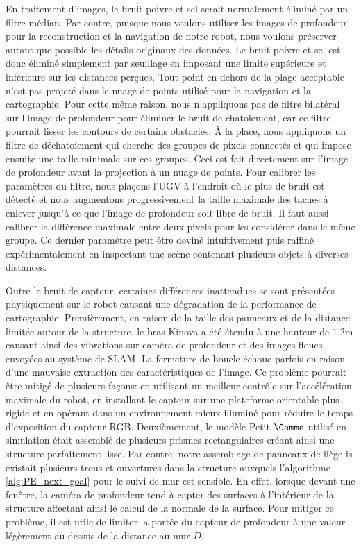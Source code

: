 En traitement d'images, le bruit poivre et sel serait normalement éliminé par un filtre médian. Par contre, puisque nous voulons utiliser les images de profondeur pour la reconstruction et la navigation de notre robot, nous voulons préserver autant que possible les détails originaux des données. Le bruit poivre et sel est donc éliminé simplement par seuillage en imposant une limite supérieure et inférieure sur les distances perçues. Tout point en dehors de la plage acceptable n'est pas projeté dans le nuage de points utilisé pour la navigation et la cartographie. Pour cette même raison, nous n'appliquons pas de filtre bilatéral sur l'image de profondeur pour éliminer le bruit de chatoiement, car ce filtre pourrait lisser les contours de certains obstacles. À la place, nous appliquons un filtre de déchatoiement qui cherche des groupes de pixels connectés et qui impose ensuite une taille minimale sur ces groupes. Ceci est fait directement sur l'image de profondeur avant la projection à un nuage de points. Pour calibrer les paramètres du filtre, nous plaçons l'UGV à l'endroit où le plus de bruit est détecté et nous augmentons progressivement la taille maximale des taches à enlever jusqu'à ce que l'image de profondeur soit libre de bruit. Il faut aussi calibrer la différence maximale entre deux pixels pour les considérer dans le même groupe. Ce dernier paramètre peut être deviné intuitivement puis raffiné expérimentalement en inspectant une scène contenant plusieurs objets à diverses distances.

Outre le bruit de capteur, certaines différences inattendues se sont présentées physiquement sur le robot causant une dégradation de la performance de cartographie. Premièrement, en raison de la taille des panneaux et de la distance limitée autour de la structure, le bras Kinova a été étendu à une hauteur de $1.2$m causant ainsi des vibrations sur caméra de profondeur et des images floues envoyées au système de SLAM. La fermeture de boucle échoue parfois en raison d'une mauvaise extraction des caractéristiques de l'image. Ce problème pourrait être mitigé de plusieurs façons: en utilisant un meilleur contrôle sur l'accélération maximale du robot, en installant le capteur sur une plateforme orientable plus rigide et en opérant dans un environnement mieux illuminé pour réduire le temps d'exposition du capteur RGB. Deuxièmement, le modèle Petit $\Gamme$ utilisé en simulation était assemblé de plusieurs prismes rectangulaires créant ainsi une structure parfaitement lisse. Par contre, notre assemblage de panneaux de liège is existait plusieurs trous et ouvertures dans la structure auxquels l'algorithme \ref{alg:PE_next_goal} pour le suivi de mur est sensible. En effet, lorsque devant une fenêtre, la caméra de profondeur tend à capter des surfaces à l'intérieur de la structure affectant ainsi le calcul de la normale de la surface. Pour mitiger ce problème, il est utile de limiter la portée du capteur de profondeur à une valeur légèrement au-dessus de la distance au mur $D$.

